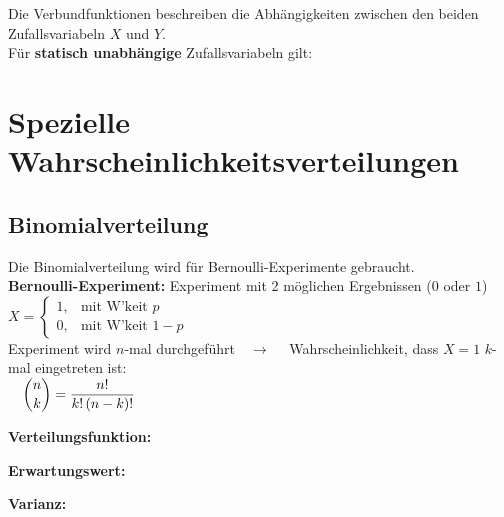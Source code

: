 			Die Verbundfunktionen beschreiben die Abhängigkeiten zwischen den beiden Zufallsvariabeln $X$ und $Y$.\\[0.2cm]
			Für \textbf{statisch unabhängige} Zufallsvariabeln gilt:\\[0.2cm]
			$\qquad$\text{\Large$\Leftrightarrow$}$\qquad $


	\section{Spezielle Wahrscheinlichkeitsverteilungen}
		\subsection{Binomialverteilung}
			Die Binomialverteilung wird für Bernoulli-Experimente gebraucht.\\[0.2cm]
			\textbf{Bernoulli-Experiment:} Experiment mit 2 möglichen Ergebnissen ($0$ oder $1$)\\[0.2cm]
			$X = \begin{cases}1,& \text{mit W'keit }p\\0,& \text{mit W'keit }1-p\end{cases}$\\[0.2cm]
			Experiment wird $n$-mal durchgeführt$\quad\rightarrow\quad$ Wahrscheinlichkeit, dass $X=1$ $k$-mal eingetreten ist:\\[0.2cm]
			$\quad \dbinom{n}{k} = \dfrac{n!}{k!\,(n-k)!}$\\

			\begin{minipage}{0.4\textwidth}
				\textbf{Verteilungsfunktion:}
			\end{minipage}
			\begin{minipage}{0.3\textwidth}
				\textbf{Erwartungswert:}
			\end{minipage}
			\begin{minipage}{0.3\textwidth}
				\textbf{Varianz:}
			\end{minipage}

